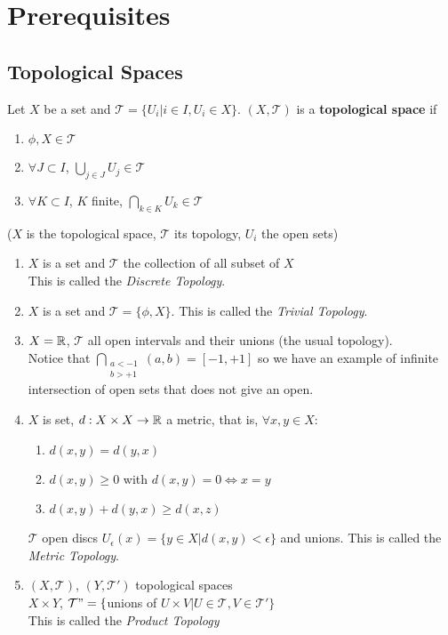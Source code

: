 \documentclass[../main/main.tex]{subfiles}
\newcommand{\topo}{\mathcal T}
\begin{document}
\chapter{Prerequisites}
\section{Topological Spaces}

\begin{dfn}
Let $X$ be a set and $\topo=\{U_i|i\in I,U_i\in X\}$. $(X,\mathcal T)$ is a \textbf{topological space} if 
\begin{enumerate}
\item $\phi,X\in\mathcal T$
\item $\forall J\subset I$, $\bigcup_{j\in J}U_j\in\mathcal T$
\item $\forall K\subset I$, $K$ finite, $\bigcap_{k\in K}U_k\in\mathcal T$
\end{enumerate}
($X$ is the topological space, $\mathcal T$ its topology, $U_i$ the open sets)
\end{dfn}

\begin{es}
\hspace{1cm}
\begin{enumerate}[label=(\alph*)]
\item $X$ is a set and $\mathcal T$ the collection of all subset of $X$\\
This is called the \emph{Discrete Topology}.
\item $X$ is a set and $\mathcal T=\{\phi,X\}$. This is called the \emph{Trivial Topology}.
\item $X=\mathbb R$, $\topo$ all open intervals and their unions (the usual topology).\\
Notice that $\bigcap_{\substack{a<-1\\b>+1}}(a,b)=[-1,+1]$ so we have an example of infinite intersection of open sets that does not give an open.
\item $X$ is set, $d:X\times X\to\mathbb R$ a metric, that is, $\forall x,y\in X$:
\begin{enumerate}
\item $d(x,y)=d(y,x)$
\item $d(x,y)\geq0$ with $d(x,y)=0\Leftrightarrow x=y$
\item $d(x,y)+d(y,x)\geq d(x,z)$
\end{enumerate}
$\topo$ open discs $U_\epsilon(x)=\{y\in X|d(x,y)<\epsilon\}$ and unions. This is called the \emph{Metric Topology}.
\item $(X,\topo)$, $(Y,\topo')$ topological spaces\\
$X\times Y$, $\topo"=\{$unions of $U\times V|U\in\topo, V\in\topo'\}$\\
This is called the \emph{Product Topology}
\end{enumerate}
\end{es}
\end{document}
